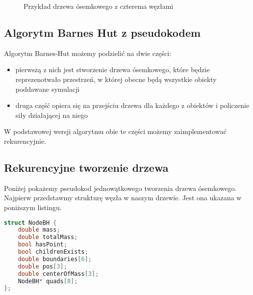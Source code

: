 \documentclass[14pt,twoside,a4paper]{article}
\theoremstyle{definition}
\begin{document}
\begin{figure}
    \centering
    \def\svgwidth{\columnwidth}
    
    \caption{Przykład drzewa ósemkowego z czterema węzłami}
\end{figure}

\subsection{\Large Algorytm Barnes Hut z pseudokodem}
Algorytm Barnes-Hut możemy podzielić na dwie części:
\begin{itemize}
  \item pierwszą z nich jest stworzenie drzewa ósemkowego, które będzie reprezenotwało przestrzeń, w której obecne będą wszystkie obiekty poddawane symulacji
  \item druga część opiera się na przejściu drzewa dla każdego z obiektów i policzenie siły działającej na niego
\end{itemize}
W podstawowej wersji algorytmu obie te części możemy zaimplementować rekurencyjnie.

\subsection{\Large Rekurencyjne tworzenie drzewa}
Poniżej pokażemy pseudokod jednowątkowego tworzenia drzewa ósemkowego. Najpierw przedstawmy strukturę węzła w naszym drzewie. Jest ona ukazana w poniższym listingu.

\begin{lstlisting}[language=C++, frame=single, framerule=2pt, caption=Struktura węzła w drzewie ósemkowym]
struct NodeBH {
    double mass;
    double totalMass;
    bool hasPoint;
    bool childrenExists;
    double boundaries[6];
    double pos[3];
    double centerOfMass[3];
    NodeBH* quads[8];
};
\end{lstlisting}
\end{document}
